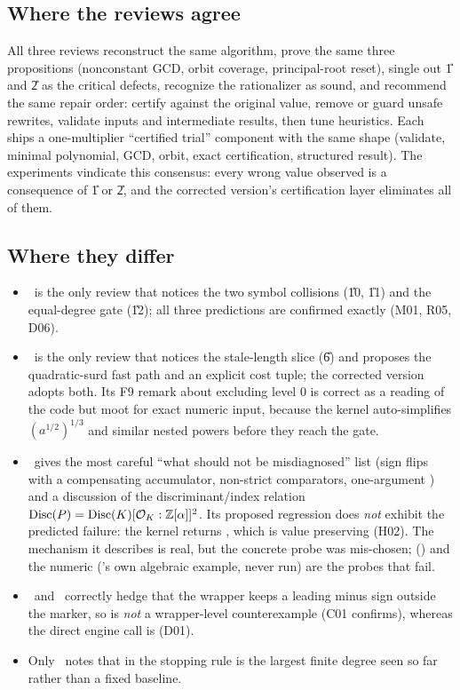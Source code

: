 \subsection{Where the reviews agree}
All three reviews reconstruct the same algorithm, prove the same three
propositions (nonconstant GCD, orbit coverage, principal-root reset), single
out \U{1} and \U{2} as the critical defects, recognize the rationalizer as
sound, and recommend the same repair order: certify against the original value,
remove or guard unsafe rewrites, validate inputs and intermediate results, then
tune heuristics. Each ships a one-multiplier ``certified trial'' component
with the same shape (validate, minimal polynomial, GCD, orbit, exact
certification, structured result). The experiments vindicate this consensus:
every wrong value observed is a consequence of \U{1} or \U{2}, and the
corrected version's certification layer eliminates all of them.

\subsection{Where they differ}
\begin{itemize}
\item \RII\ is the only review that notices the two symbol collisions (\U{10},
      \U{11}) and the equal-degree gate (\U{12}); all three predictions are
      confirmed exactly (M01, R05, D06).
\item \RIII\ is the only review that notices the stale-length slice (\U{6}) and
      proposes the quadratic-surd fast path and an explicit cost tuple; the
      corrected version adopts both. Its F9 remark about  excluding level 0 is correct as a reading of the code but
      moot for exact numeric input, because the kernel auto-simplifies
      $(a^{1/2})^{1/3}$ and similar nested powers before they reach the gate.
\item \RI\ gives the most careful ``what should not be misdiagnosed'' list
      (sign flips with a compensating accumulator, non-strict comparators,
      one-argument ) and a discussion of the
      discriminant/index relation $\operatorname{Disc}(P)=\operatorname{Disc}(K)[\mathcal O_K:\mathbb{Z}[\alpha]]^2$.
      Its proposed regression  does \emph{not}
      exhibit the predicted failure: the kernel returns ,
      which is value preserving (H02). The mechanism it describes is real, but
      the concrete probe was mis-chosen;  (\RIII) and the
      numeric  (\RI's own algebraic example,
      never run) are the probes that fail.
\item \RII\ and \RIII\ correctly hedge that the wrapper keeps a leading minus
      sign outside the marker, so  is
      \emph{not} a wrapper-level counterexample (C01 confirms), whereas the
      direct engine call is (D01).
\item Only \RIII\ notes that  in the stopping rule is
      the largest finite degree seen so far rather than a fixed baseline.
\end{itemize}

